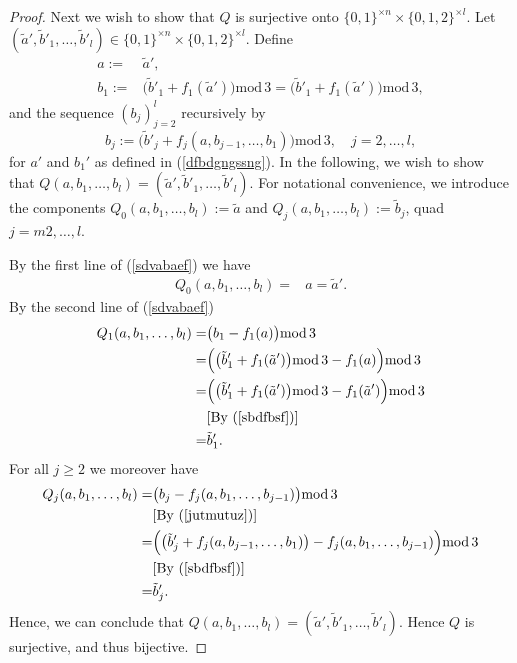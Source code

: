 \documentclass[a4paper,aps,floatfix]{revtex4}
\begin{document}
\begin{proof}
Next we wish to show that $Q$ is surjective onto  $\{0,1\}^{\times n}\times \{0,1,2\}^{\times l}$.
Let $ (\tilde{a}',\tilde{b}'_1,\ldots,\tilde{b}'_l)\in \{0,1\}^{\times n}\times \{0,1,2\}^{\times l}$. 
Define
\begin{equation}
\label{dfbdgngssng}
\begin{split}
a :=& \tilde{a}',\\
b_1 := & \big(\tilde{b}'_1 +f_1(\tilde{a}')\big)\mathrm{mod}\, 3 = \big(\tilde{b}'_1 +f_1(\tilde{a}')\big)\mathrm{mod}\, 3,
\end{split}
\end{equation}
and the sequence $(b_j)_{j=2}^{l}$ recursively by
\begin{equation}
\label{jutmutuz}
b_{j} := \big(\tilde{b}'_j + f_j(a,b_{j-1},\ldots, b_1)\big)\mathrm{mod}\, 3,\quad j = 2,\ldots, l,
\end{equation}
for $a'$ and $b_1'$ as defined in (\ref{dfbdgngssng}).
In the following, we wish to show that  $Q(a,b_1,\ldots,b_l) =  (\tilde{a}',\tilde{b}'_1,\ldots,\tilde{b}'_l)$. For notational convenience, we introduce the components $Q_0(a,b_1,\ldots,b_l)  := \tilde{a}$ and $Q_j(a,b_1,\ldots,b_l) := \tilde{b}_j$, quad $j =m2,\ldots,l$.  






By the first line of (\ref{sdvabaef}) we have
\begin{equation}
\begin{split}
Q_0(a,b_1,\ldots,b_l) = & a = \tilde{a}'.
\end{split}
\end{equation}
By the second line of (\ref{sdvabaef})
\begin{equation}
\begin{split}
Q_1(a,b_1,\ldots,b_l) = & \big(b_1-f_1(a)\big)\mathrm{mod}\, 3\\
= & \Big( \big(\tilde{b}'_1 +f_1(\tilde{a}')\big)\mathrm{mod}\, 3  -f_1(a)\Big)\mathrm{mod}\, 3   \\  
= & \Big( \big(\tilde{b}'_1 +f_1(\tilde{a}')\big)\mathrm{mod}\, 3  -f_1(\tilde{a}')\Big)\mathrm{mod}\, 3   \\  
& [\textrm{By (\ref{sbdfbsf})}]\\
= &  \tilde{b}'_1. 
\end{split}
\end{equation}
For all $j\geq 2$ we moreover have
\begin{equation}
\begin{split}
Q_j(a,b_1,\ldots,b_l) = & \big( b_j-f_j(a,b_1,\ldots,b_{j-1})\big)\mathrm{mod}\, 3\\
& [\textrm{By (\ref{jutmutuz})}]\\
= &  \Big(  \big(\tilde{b}'_j + f_j(a,b_{j-1},\ldots, b_1)\big)   -f_j(a,b_1,\ldots,b_{j-1})\Big)\mathrm{mod}\, 3\\
& [\textrm{By (\ref{sbdfbsf})}]\\
= & \tilde{b}'_j.
\end{split}
\end{equation}
Hence, we can conclude that $Q(a,b_1,\ldots,b_l) =  (\tilde{a}',\tilde{b}'_1,\ldots,\tilde{b}'_l)$. Hence $Q$ is surjective, and thus bijective.
\end{proof}
\end{document}
